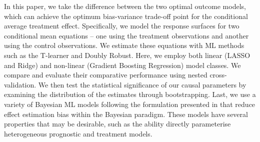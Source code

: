 \documentclass[12pt, a4paper]{article}
\begin{document}
In this paper, we take the difference between the two optimal outcome models,
which can achieve the optimum bias-variance trade-off point for the conditional
average treatment effect. Specifically, we model the response surfaces for two
conditional mean equations -- one using the treatment observations and another
using the control observations. We estimate these equations with ML methods
such as the T-learner and Doubly Robust. Here, we employ both linear (LASSO and
Ridge) and non-linear (Gradient Boosting Regression) model classes. We compare
and evaluate their comparative performance using nested cross-validation. We
then test the statistical significance of our causal parameters by examining
the distribution of the estimates through bootstrapping. Last, we use a variety
of Bayesian ML models following the formulation presented in \citet{hahn2020}
that reduce effect estimation bias within the Bayesian paradigm. These models
have several properties that may be desirable, such as the ability directly
parameterise heterogeneous prognostic and treatment models.
\end{document}
